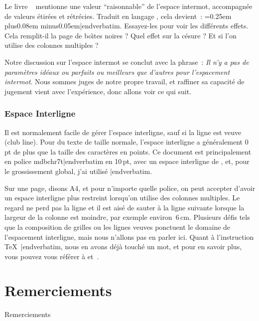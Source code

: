 Le livre ~\cite{elements_typographic} mentionne une valeur ``raisonnable'' de l'espace intermot, accompagn\'ee de valeurs \'etir\'ees et r\'etr\'ecies. Traduit en langage \capstex, cela devient~: {\color{brown}\verbatim \spaceskip=0.25em plus0.08em minus0.05em|endverbatim}. Essayez-les pour voir les diff\'erents effets. Cela remplit-il la page de bo\^\i tes noires ? Quel effet sur la c\'esure ? Et si l'on utilise des colonnes multiples ?

Notre discussion sur l'espace intermot se conclut avec la phrase~: {\sl Il n'y a pas de param\`etres id\'eaux ou parfaits ou meilleurs que d'autres pour l'espacement intermot}. Nous sommes juges de notre propre travail, et raffiner sa capacit\'e de jugement vient avec l'exp\'erience, donc allons voir ce qui suit.

\subsubsection{Espace Interligne}
Il est normalement facile de g\'erer l'espace interligne, sauf si la ligne est veuve (club line). Pour du texte de taille normale, l'espace interligne a g\'en\'eralement 0\,pt de plus que la taille des caract\`eres en points. Ce document est principalement en police {\verbatim mdbchr7t|endverbatim} en 10\,pt, avec un espace interligne de {\tt\the\baselineskip}, et, pour le grossissement global, j'ai utilis\'e {\verbatim {}|endverbatim}.

Sur une page, disons A4, et pour n'importe quelle police, on peut accepter d'avoir un espace interligne plus restreint lorsqu'on utilise des colonnes multiples. Le regard ne perd pas la ligne et il est ais\'e de sauter \`a la ligne suivante lorsque la largeur de la colonne est moindre, par exemple environ~6\,cm. Plusieurs d\'efis tels que la composition de grilles ou les lignes veuves ponctuent le domaine de l'espacement interligne, mais nous n'allons pas en parler ici. Quant \`a l'instruction \TeX\ {\color{brown}\verbatim \baselineskip|endverbatim}, nous en avons d\'ej\`a touch\'e un mot, et pour en savoir plus, vous pouvez vous r\'ef\'erer \`a \cite{knuth_texbook} et~\cite{against_widows}.



\section{Remerciements}{Remerciements}

